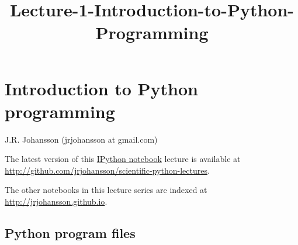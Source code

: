 \documentclass[11pt]{article}
\title{Lecture-1-Introduction-to-Python-Programming}
\begin{document}
    
    \maketitle
    
    

    
    \hypertarget{introduction-to-python-programming}{%
\section{Introduction to Python
programming}\label{introduction-to-python-programming}}

    J.R. Johansson (jrjohansson at gmail.com)

The latest version of this
\href{http://ipython.org/notebook.html}{IPython notebook} lecture is
available at
\url{http://github.com/jrjohansson/scientific-python-lectures}.

The other notebooks in this lecture series are indexed at
\url{http://jrjohansson.github.io}.

    \hypertarget{python-program-files}{%
\subsection{Python program files}\label{python-program-files}}
\end{document}
